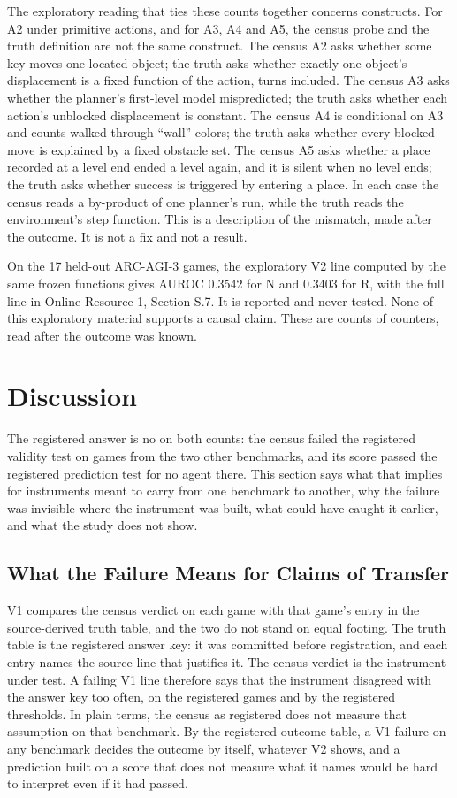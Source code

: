 \documentclass[twocolumn]{svjour3}
\begin{document}
The exploratory reading that ties these counts together concerns
constructs. For A2 under primitive actions, and for A3, A4 and A5, the
census probe and the truth definition are not the same construct. The
census A2 asks whether some key moves one located object; the truth asks
whether exactly one object's displacement is a fixed function of the
action, turns included. The census A3 asks whether the planner's
first-level model mispredicted; the truth asks whether each action's
unblocked displacement is constant. The census A4 is conditional on A3
and counts walked-through ``wall'' colors; the truth asks whether every
blocked move is explained by a fixed obstacle set. The census A5 asks
whether a place recorded at a level end ended a level again, and it is
silent when no level ends; the truth asks whether success is triggered
by entering a place. In each case the census reads a by-product of one
planner's run, while the truth reads the environment's step function.
This is a description of the mismatch, made after the outcome. It is not
a fix and not a result.

On the 17 held-out ARC-AGI-3 games, the exploratory V2 line computed by
the same frozen functions gives AUROC 0.3542 for N and 0.3403 for R,
with the full line in Online Resource 1, Section S.7. It is reported and
never tested. None of this exploratory material supports a causal claim.
These are counts of counters, read after the outcome was known.

\section{Discussion}\label{sec:discussion}

The registered answer is no on both counts: the census failed the
registered validity test on games from the two other benchmarks, and its
score passed the registered prediction test for no agent there. This
section says what that implies for instruments meant to carry from one
benchmark to another, why the failure was invisible where the instrument
was built, what could have caught it earlier, and what the study does
not show.

\subsection{What the Failure Means for Claims of
Transfer}\label{sec:meaning}

V1 compares the census verdict on each game with that game's entry in
the source-derived truth table, and the two do not stand on equal
footing. The truth table is the registered answer key: it was committed
before registration, and each entry names the source line that justifies
it. The census verdict is the instrument under test. A failing V1 line
therefore says that the instrument disagreed with the answer key too
often, on the registered games and by the registered thresholds. In
plain terms, the census as registered does not measure that assumption
on that benchmark. By the registered outcome table, a V1 failure on any
benchmark decides the outcome by itself, whatever V2 shows, and a
prediction built on a score that does not measure what it names would be
hard to interpret even if it had passed.
\end{document}
